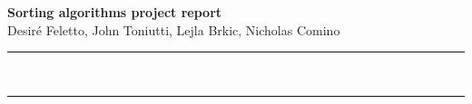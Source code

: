 \documentclass[a4paper,12pt]{article}
\renewenvironment{abstract}
 {\par\noindent\textbf{\abstractname}\ \ignorespaces \\}
 {\par\noindent\medskip}
\begin{document}
\renewcommand*{\thefootnote}{\fnsymbol{footnote}}

\begin{center}
\Large{\textbf{Sorting algorithms project report}}
\vspace{0.4cm}
\normalsize
\\ Desiré Feletto, John Toniutti, Lejla Brkic, Nicholas Comino \\

\vspace{0.4cm}
\medskip
\normalsize

\end{center}

{\color{gray}\hrule}
\vspace{0.4cm}
\medskip

\begin{abstract}

\end{abstract}

{\color{gray}\hrule}
\medskip









\end{document}
